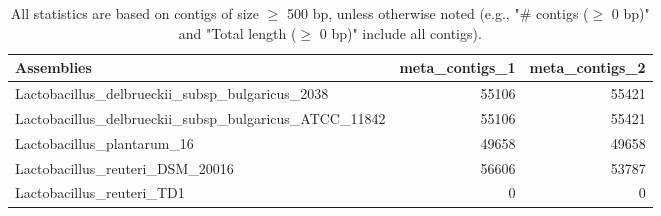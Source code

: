 \documentclass[12pt,a4paper]{article}
\begin{document}
\begin{table}[ht]
\begin{center}
\caption{All statistics are based on contigs of size $\geq$ 500 bp, unless otherwise noted (e.g., "\# contigs ($\geq$ 0 bp)" and "Total length ($\geq$ 0 bp)" include all contigs).}
\begin{tabular}{|l*{2}{|r}|}
\hline
Assemblies & meta\_contigs\_1 & meta\_contigs\_2 \\ \hline
Lactobacillus\_delbrueckii\_subsp\_bulgaricus\_2038 & 55106 & 55421 \\ \hline
Lactobacillus\_delbrueckii\_subsp\_bulgaricus\_ATCC\_11842 & 55106 & 55421 \\ \hline
Lactobacillus\_plantarum\_16 & 49658 & 49658 \\ \hline
Lactobacillus\_reuteri\_DSM\_20016 & 56606 & 53787 \\ \hline
Lactobacillus\_reuteri\_TD1 & 0 & 0 \\ \hline
\end{tabular}
\end{center}
\end{table}
\end{document}
